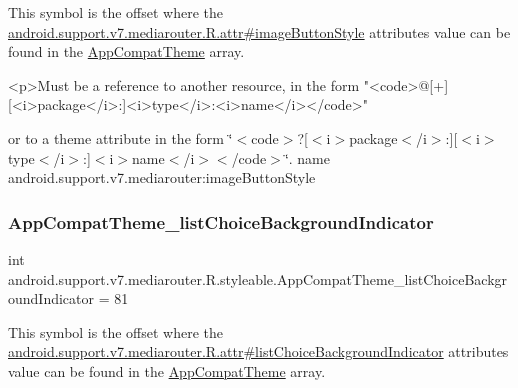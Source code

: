 This symbol is the offset where the \hyperlink{classandroid_1_1support_1_1v7_1_1mediarouter_1_1R_1_1attr_ab224fe2322d8781a607f7384308300d0}{android.\+support.\+v7.\+mediarouter.\+R.\+attr\#image\+Button\+Style} attribute\textquotesingle{}s value can be found in the \hyperlink{classandroid_1_1support_1_1v7_1_1mediarouter_1_1R_1_1styleable_a4e3d3900c75d49aeb2f283cac00214d6}{App\+Compat\+Theme} array.

\begin{DoxyVerb}      <p>Must be a reference to another resource, in the form "<code>@[+][<i>package</i>:]<i>type</i>:<i>name</i></code>"
\end{DoxyVerb}
 or to a theme attribute in the form \char`\"{}$<$code$>$?\mbox{[}$<$i$>$package$<$/i$>$\+:\mbox{]}\mbox{[}$<$i$>$type$<$/i$>$\+:\mbox{]}$<$i$>$name$<$/i$>$$<$/code$>$\char`\"{}.  name android.\+support.\+v7.\+mediarouter\+:image\+Button\+Style \mbox{\label{classandroid_1_1support_1_1v7_1_1mediarouter_1_1R_1_1styleable_a0231c101569fa781bb9a5ecba4ff728f}} 
\subsubsection{\texorpdfstring{App\+Compat\+Theme\+\_\+list\+Choice\+Background\+Indicator}{AppCompatTheme\_listChoiceBackgroundIndicator}}
{\footnotesize\ttfamily int android.\+support.\+v7.\+mediarouter.\+R.\+styleable.\+App\+Compat\+Theme\+\_\+list\+Choice\+Background\+Indicator = 81\hspace{0.3cm}{\ttfamily [static]}}

This symbol is the offset where the \hyperlink{classandroid_1_1support_1_1v7_1_1mediarouter_1_1R_1_1attr_a580e0b8b5fb7b57b904717752665ed0e}{android.\+support.\+v7.\+mediarouter.\+R.\+attr\#list\+Choice\+Background\+Indicator} attribute\textquotesingle{}s value can be found in the \hyperlink{classandroid_1_1support_1_1v7_1_1mediarouter_1_1R_1_1styleable_a4e3d3900c75d49aeb2f283cac00214d6}{App\+Compat\+Theme} array.

